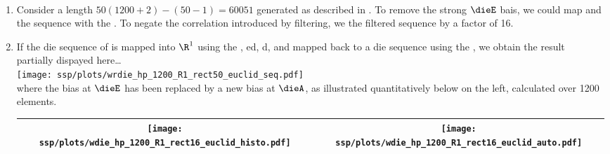 \begin{example}
\label{ex:wdie_hp}
\mbox{}\\
\begin{enumerate}
  \item \label{item:wdie_hp_seq}
        Consider a length $50(1200+2)-(50-1)=60051$   generated as 
        described in .
        To remove the strong $\dieE$ bais, we could map and  the sequence with the 
         .
        To negate the correlation introduced by filtering, 
        we  the filtered sequence by a factor of 16.

  \item \label{item:wdie_hp_R1_rect16_euclid}
        If the die sequence of  is mapped into $\R^1$ using the
         , ed,
        d, and mapped back to a die sequence using the ,
        we obtain the result partially dispayed here\ldots
          \\\texttt{[image: ssp/plots/wrdie\_hp\_1200\_R1\_rect50\_euclid\_seq.pdf]}\\
        where the bias at $\dieE$ has been replaced by a new bias at $\dieA$, 
        as illustrated quantitatively below on the left, 
        calculated over 1200 elements. 
          \\\begin{tabular}{|>{\scs}c|>{\scs}c|}
               \hline
               \texttt{[image: ssp/plots/wdie\_hp\_1200\_R1\_rect16\_euclid\_histo.pdf]}
              &\texttt{[image: ssp/plots/wdie\_hp\_1200\_R1\_rect16\_euclid\_auto.pdf]}
             \\\hline
          \end{tabular}


\end{enumerate}
\end{example}
